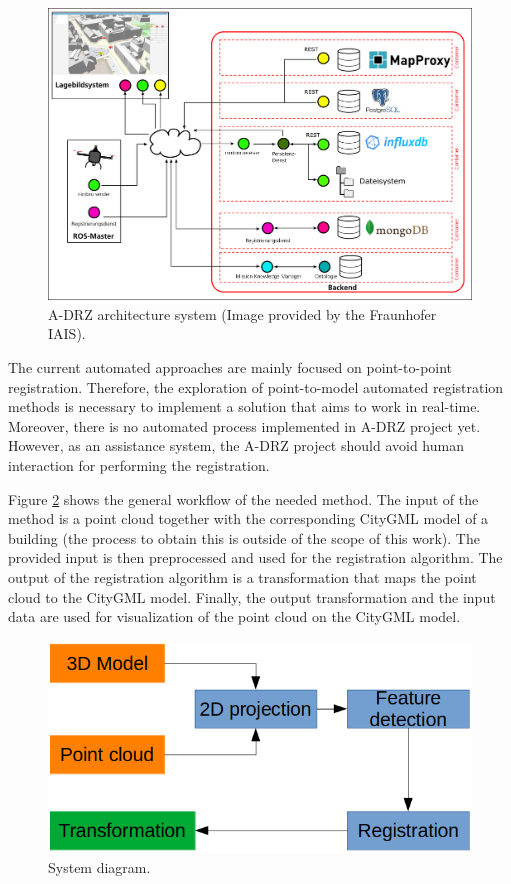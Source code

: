         \begin{figure}[H]
            \includegraphics[width=\textwidth]{images/Systemaufbau.png}
            \caption{A-DRZ architecture system (Image provided by the Fraunhofer IAIS).}
            \label{fig:adrz}
        \end{figure}

        The current automated approaches are mainly focused on point-to-point registration.
        Therefore, the exploration of point-to-model automated registration methods is necessary to implement a solution that aims to work in real-time.
        Moreover, there is no automated process implemented in A-DRZ project yet. 
        However, as an assistance system, the A-DRZ project should avoid human interaction for performing the registration.

        Figure \ref{fig:system_diagram} shows the general workflow of the needed method.
        The input of the method is a point cloud together with the corresponding CityGML model of a building  
        (the process to obtain this is outside of the scope of this work).
        The provided input is then preprocessed and used for the registration algorithm.
        The output of the registration algorithm is a transformation that maps the point cloud to the CityGML model.
        Finally, the output transformation and the input data are used for visualization of the point cloud on the CityGML model.

        \begin{figure}[H]
            \centering
            \includegraphics[scale=0.5]{images/RegistrationProcess}
            \caption{System diagram.}
            \label{fig:system_diagram}
        \end{figure}

